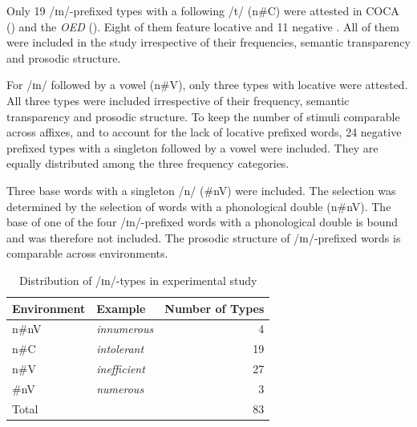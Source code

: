 Only 19 /ɪn/-prefixed types with a following /t/ ({n\#C}) were attested  in COCA (\citealt{Davies.20082014}) and the \textit{OED} (\citealt{OED.2013}).  Eight of them feature locative  and 11 negative . All of them were included in the study irrespective of their frequencies, semantic transparency and prosodic structure. 

For /ɪn/ followed by a vowel ({n\#V}), only three types with locative  were attested. All three types were included irrespective of their frequency, semantic transparency and prosodic structure. 
To keep the number of stimuli comparable across affixes, and to account for the lack of locative prefixed words, 24 negative prefixed types with a singleton followed by a vowel were included. They are equally distributed among the three frequency categories.  



Three base words with a singleton /n/ ({\#nV}) were included. The selection was determined by the selection of words with a phonological double ({n\#nV}). The base of one of the four /ɪn/-prefixed words with a phonological double is bound and was therefore not included. 
The prosodic structure of /ɪn/-prefixed words is comparable across environments.


\begin{table}[H]
	\caption{Distribution of /ɪn/-types in experimental study}
	\label{tbl:distribution of in  types in experiment}

	\begin{center}
		\begin{tabular} {llr}

			Environment & Example & Number of  Types\\

			\hline
			n\#nV&\color[HTML]{3166FF}\textit{innumerous} & 4 \\ 

			n\#C&\color[HTML]{3166FF}\textit{intolerant} & 19 \\ 
						n\#V&\color[HTML]{3166FF}\textit{inefficient} & 27 \\ 
			\#nV&\color[HTML]{3166FF}\textit{numerous} & 3\\ 
			\hline   
			Total&  & 83 \\ 
			\hline     	


		\end{tabular}
	\end{center}
\end{table}


